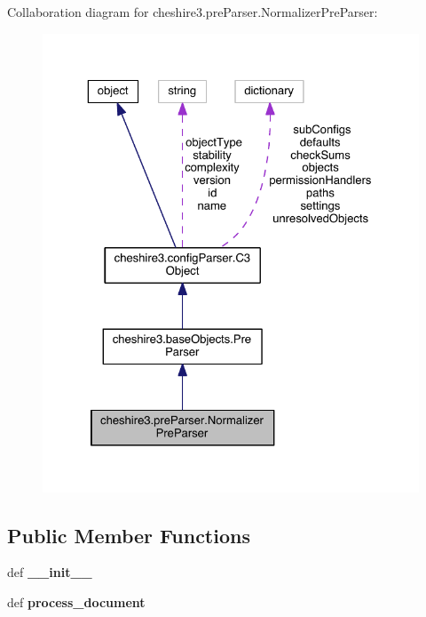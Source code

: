 Collaboration diagram for cheshire3.\-pre\-Parser.\-Normalizer\-Pre\-Parser\-:
\nopagebreak
\begin{figure}[H]
\begin{center}
\leavevmode
\includegraphics[width=325pt]{classcheshire3_1_1pre_parser_1_1_normalizer_pre_parser__coll__graph}
\end{center}
\end{figure}
\subsection*{Public Member Functions}
\begin{DoxyCompactItemize}
\item 
\hypertarget{classcheshire3_1_1pre_parser_1_1_normalizer_pre_parser_a03a6d45ceb68b4d6af7a4ea2185d0c5a}{def {\bfseries \-\_\-\-\_\-init\-\_\-\-\_\-}}\label{classcheshire3_1_1pre_parser_1_1_normalizer_pre_parser_a03a6d45ceb68b4d6af7a4ea2185d0c5a}

\item 
\hypertarget{classcheshire3_1_1pre_parser_1_1_normalizer_pre_parser_a374b3f209e37bafa55bf3fdcf42e7b4e}{def {\bfseries process\-\_\-document}}\label{classcheshire3_1_1pre_parser_1_1_normalizer_pre_parser_a374b3f209e37bafa55bf3fdcf42e7b4e}

\end{DoxyCompactItemize}
